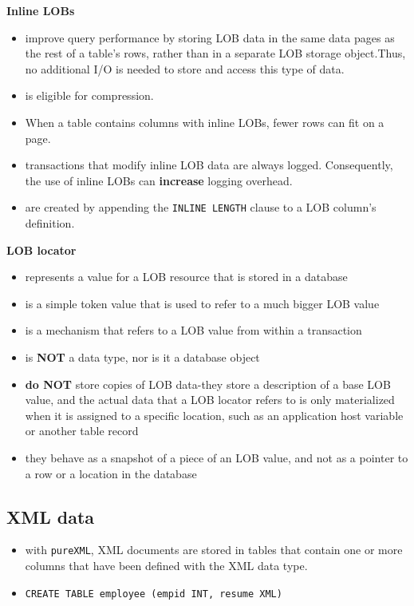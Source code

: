 \documentclass{article}
\begin{document}
\smallskip

\textbf{Inline LOBs}
\begin{itemize}
\item improve query performance by storing LOB data in the same data pages as the rest of 
a table's rows, rather than in a separate LOB storage object.Thus, no additional I/O is needed to store and access this type of data. 
\item is eligible for compression.
\item When a table contains columns with inline LOBs, fewer rows can fit on a page.
\item transactions that modify inline LOB data are always logged. Consequently, the use of inline LOBs
can \textbf{increase} logging overhead.
\item are created by appending the \texttt{INLINE LENGTH} clause to a LOB column's definition.
\end{itemize}

\smallskip

\textbf{LOB locator}
\begin{itemize}
\item represents a value for a LOB resource that is stored in a database
\item is a simple token value that is used to refer to a much bigger LOB value
\item is a mechanism that refers to a LOB value from within a transaction
\item is \textbf{NOT} a data type, nor is it a database object
\item \textbf{do NOT} store copies of LOB data-they store a description of a base LOB value,
and the actual data that a LOB locator refers to is only materialized when it is assigned to a specific
location, such as an application host variable or another table record
\item they behave as a snapshot of a piece of an LOB value, and not as a pointer to a row or a location
in the database
\end{itemize}

\subsection{XML data}
\begin{itemize}
\item with \texttt{pureXML}, XML documents are stored in tables that contain one or more columns that have
been defined with the XML data type.
\item \texttt{CREATE TABLE employee (empid INT, resume XML)}
\end{itemize}
\end{document}

